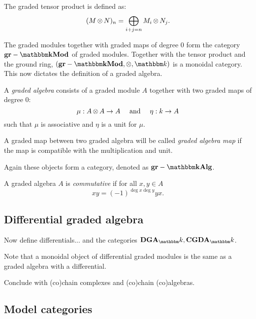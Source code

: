 \begin{definition}
	The graded tensor product is defined as:
	$$ (M \operatorname*{\otimes} N)_n = \bigoplus_{i + j = n} M_i \operatorname*{\otimes} N_j. $$
\end{definition}

The graded modules together with graded maps of degree $0$ form the category $\grMod{\k}$ of graded modules. Together with the tensor product and the ground ring, $(\grMod{\k}, \tensor, \k)$ is a monoidal category. This now dictates the definition of a graded algebra.

\begin{definition}
	A \emph{graded algebra} consists of a graded module $A$ together with two graded maps of degree $0$:
	$$ \mu: A \operatorname*{\otimes} A \to A \quad\text{ and }\quad \eta: k \to A $$
	such that $\mu$ is associative and $\eta$ is a unit for $\mu$.

	A graded map between two graded algebra will be called \emph{graded algebra map} if the map is compatible with the multiplication and unit.
\end{definition}

Again these objects form a category, denoted as $\grAlg{\k}$.

\begin{definition}
	A graded algebra $A$ is \emph{commutative} if for all $x, y \in A$
	$$ xy = (-1)^{\deg{x}\deg{y}}yx. $$
\end{definition}


\subsection{Differential graded algebra}
Now define differentials... and the categories $\cat{DGA}_\k, \cat{CGDA}_\k$.

Note that a monoidal object of differential graded modules is the same as a graded algebra with a differential.

Conclude with (co)chain complexes and (co)chain (co)algebras.


\subsection{Model categories}

